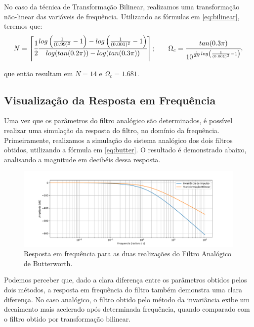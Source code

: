 \documentclass[a4paper,11pt]{article}
\numberwithin{figure}{section}
\numberwithin{equation}{section}
\numberwithin{table}{section}
\theoremstyle{definition}
\begin{document}
No caso da técnica de Transformação Bilinear, realizamos uma transformação não-linear das variáveis de frequência. Utilizando as fórmulas em \eqref{eq:bilinear}, teremos que:
\begin{equation}
\begin{matrix}
	N = \left\lceil \cfrac{1}{2} \cfrac{log \left(\frac{1}{(0.99)^2} - 1 \right) - log \left( \frac{1}{(0.001)^2} - 1 \right)}{log(tan(0.2\pi)) - log(tan(0.3\pi))} \right\rceil; & & 
	\Omega_c = \cfrac{tan(0.3\pi)}{10^{\frac{1}{2N} log \left(\frac{1}{(0.001)^2} - 1 \right)}}
\end{matrix},
\end{equation}

\noindent que então resultam em $N = 14$ e $\Omega_c = 1.681$. 

\subsection{Visualização da Resposta em Frequência}

Uma vez que os parâmetros do filtro analógico são determinados, é possível realizar uma simulação da resposta do filtro, no domínio da frequência. Primeiramente, realizamos a simulação do sistema analógico dos dois filtros obtidos, utilizando a fórmula em \eqref{eq:butter}. O resultado é demonstrado abaixo, analisando a magnitude em decibéis dessa resposta.

\begin{figure}[ht] \centering
	\includegraphics[width=\textwidth]{analog}
	\caption{Resposta em frequência para as duas realizações do Filtro Analógico de Butterworth.}
	\label{fig:analog}
\end{figure}

Podemos perceber que, dado a clara diferença entre os parâmetros obtidos pelos dois métodos, a resposta em frequência do filtro também demonstra uma clara diferença. No caso analógico, o filtro obtido pelo método da invariância exibe um decaimento mais acelerado após determinada frequência, quando comparado com o filtro obtido por transformação bilinear.
\end{document}
